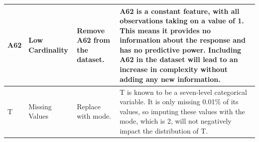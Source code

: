 \documentclass[11pt]{report}
\begin{document}
\begin{longtable}{lp{4cm}p{4cm}p{5cm}}
\midrule
A62 & Low Cardinality & Remove A62 from the dataset. & A62 is a constant feature, with all observations taking on a value of 1. This means it provides no information about the response and has no predictive power. Including A62 in the dataset will lead to an increase in complexity without adding any new information. \\
\midrule
T & Missing Values & Replace with mode. & T is known to be a seven-level categorical variable. It is only missing 0.01\% of its values, so imputing these values with the mode, which is 2, will not negatively impact the distribution of T. \\
\end{longtable}
\end{document}
